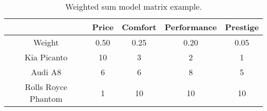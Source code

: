 \begin{table}[ht]
    \centering
    \begin{tabular}{ |c|c|c|c|c| } 
        \hline
        \rowcolor{light-gray}
        & Price & Comfort & Performance & Prestige\\
        \hline
        \cellcolor{light-gray}Weight & 0.50 & 0.25 & 0.20 & 0.05 \\ 
        \hline
        Kia Picanto & 10 & 3 & 2 & 1 \\ 
        \hline
        Audi A8 & 6 & 6 & 8 & 5 \\ 
        \hline
        Rolls Royce Phantom & 1 & 10 & 10 & 10 \\
        \hline
    \end{tabular}
    \caption{\label{tab:WSM-Example}Weighted sum model matrix example.}
\end{table}